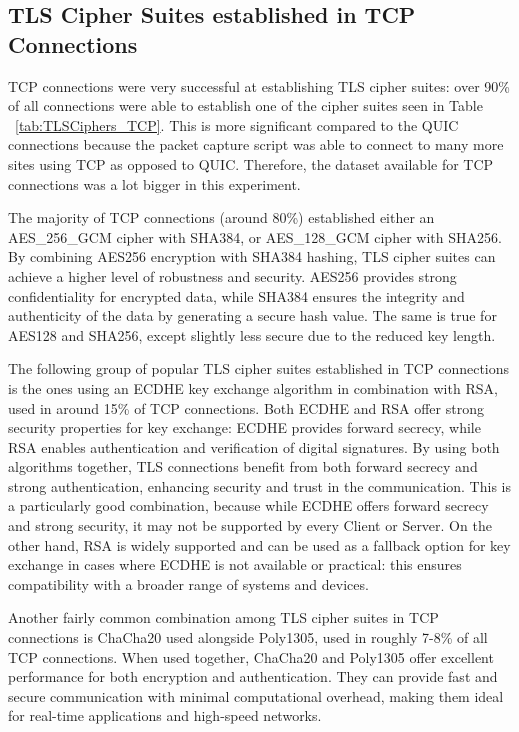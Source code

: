 \documentclass{l4proj}
\begin{document}
\subsection{TLS Cipher Suites established in TCP Connections}

TCP connections were very successful at establishing TLS cipher suites: over 90\% of all connections were able to establish one of the cipher suites seen in Table ~\ref{tab:TLSCiphers_TCP}. This is more significant compared to the QUIC connections because the packet capture script was able to connect to many more sites using TCP as opposed to QUIC. Therefore, the dataset available for TCP connections was a lot bigger in this experiment.

The majority of TCP connections (around 80\%) established either an AES\_256\_GCM cipher with SHA384, or AES\_128\_GCM cipher with SHA256. By combining AES256 encryption with SHA384 hashing, TLS cipher suites can achieve a higher level of robustness and security. AES256 provides strong confidentiality for encrypted data, while SHA384 ensures the integrity and authenticity of the data by generating a secure hash value. The same is true for AES128 and SHA256, except slightly less secure due to the reduced key length.

The following group of popular TLS cipher suites established in TCP connections is the ones using an ECDHE key exchange algorithm in combination with RSA, used in around 15\% of TCP connections. Both ECDHE and RSA offer strong security properties for key exchange: ECDHE provides forward secrecy, while RSA enables authentication and verification of digital signatures. By using both algorithms together, TLS connections benefit from both forward secrecy and strong authentication, enhancing security and trust in the communication. This is a particularly good combination, because while ECDHE offers forward secrecy and strong security, it may not be supported by every Client or Server. On the other hand, RSA is widely supported and can be used as a fallback option for key exchange in cases where ECDHE is not available or practical: this ensures compatibility with a broader range of systems and devices.

Another fairly common combination among TLS cipher suites in TCP connections is ChaCha20 used alongside Poly1305, used in roughly 7-8\% of all TCP connections. When used together, ChaCha20 and Poly1305 offer excellent performance for both encryption and authentication. They can provide fast and secure communication with minimal computational overhead, making them ideal for real-time applications and high-speed networks.
\end{document}
